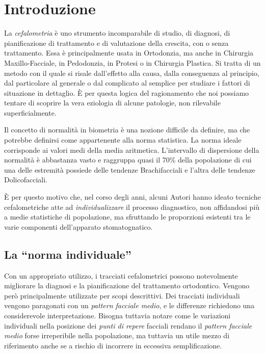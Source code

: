 \chapter{Introduzione}
La \textit{cefalometria} è uno strumento incomparabile di studio, di diagnosi, di pianificazione di trattamento e di valutazione della crescita, con o senza trattamento. Essa è principalmente usata in Ortodonzia, ma anche in Chirurgia Maxillo-Facciale, in Pedodonzia, in Protesi o in Chirurgia Plastica. Si tratta di un metodo con il quale si risale dall'effetto alla causa, dalla conseguenza al principio, dal particolare al generale o dal complicato al semplice per studiare i fattori di situazione in dettaglio. È per questa logica del ragionamento che noi possiamo tentare di scoprire la vera eziologia di alcune patologie, non rilevabile superficialmente.

Il concetto di normalità in biometria è una nozione difficile da definire, ma che potrebbe definirsi come appartenente alla norma statistica. La norma ideale corrisponde ai valori medi della media aritmetica. L'intervallo di dispersione della normalità è abbastanza vasto e raggruppa quasi il 70\% della popolazione di cui una delle estremità possiede delle tendenze Brachifacciali e l'altra delle tendenze Dolicofacciali.

È per questo motivo che, nel corso degli anni, alcuni Autori hanno ideato tecniche cefalometriche atte ad \textit{individualizzare} il processo diagnostico, non affidandosi più a medie statistiche di popolazione, ma sfruttando le proporzioni esistenti tra le varie componenti dell'apparato stomatognatico.

\section{La ``norma individuale''}

Con un appropriato utilizzo, i tracciati cefalometrici possono notevolmente migliorare la diagnosi e la pianificazione del trattamento ortodontico. Vengono però principalmente utilizzate per scopi descrittivi. Dei tracciati individuali vengono paragonati con un \textit{pattern facciale medio}, e le differenze richiedono una considerevole interpretazione. Bisogna tuttavia notare come le variazioni individuali nella posizione dei \textit{punti di repere} facciali rendano il \textit{pattern facciale medio} forse irreperibile nella popolazione, ma tuttavia un utile mezzo di riferimento anche se a rischio di incorrere in eccessiva semplificazione.

